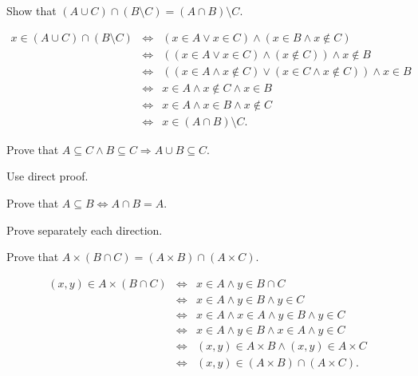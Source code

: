 \documentclass[11pt,paper=b5,footinclude,headinclude]{scrbook} %
\theoremstyle{remark}
\theoremstyle{definition} %
\theoremstyle{theorem} %
\newtheorem{ex}{Exercise\hypertarget{sol:\theex}}[chapter]
\begin{document}
\begin{ex}
\end{ex} \begin{ex}Show that $(A\cup C)\cap (B\setminus C) = (A\cap B)\setminus C$.
\begin{sol}
\begin{eqnarray*}
x\in (A\cup C)\cap (B\setminus C) &\Leftrightarrow & (x\in A \vee x\in C) \wedge (x\in B \wedge x\notin C)\\
 &\Leftrightarrow & ((x\in A \vee x\in C) \wedge (x\notin C))\wedge x\notin B\\
&\Leftrightarrow & ((x\in A \wedge x\notin C) \vee (x\in C \wedge x\notin C)) \wedge
 x\in B\\
&\Leftrightarrow & x\in A \wedge x\notin C  \wedge x\in B\\
&\Leftrightarrow & x\in A \wedge x\in B  \wedge x\notin C \\
&\Leftrightarrow & x \in (A\cap B)\setminus C. 
\end{eqnarray*}
\end{sol}

\end{ex}
\begin{ex}Prove that $A\subseteq C  \wedge B\subseteq C \Rightarrow A\cup B\subseteq C$.

\begin{sol}
    Use direct proof.
\end{sol}

\end{ex}
\begin{ex} Prove that $A\subseteq  B \Leftrightarrow A\cap B = A$.

\begin{sol}
    Prove separately each direction.
\end{sol}

\end{ex}
\begin{ex}
Prove that $A\times (B\cap C) = (A\times B)\cap (A\times C)$.


\begin{sol}
    
\begin{eqnarray*}
(x,y)\in A\times (B\cap C) &\Leftrightarrow & x \in A \wedge y\in B\cap C\\
&\Leftrightarrow & x \in A \wedge y\in B  \wedge y\in C\\
&\Leftrightarrow & x \in A \wedge x \in A\wedge y\in B  \wedge y\in C\\
&\Leftrightarrow & x \in A \wedge  y\in B  \wedge x \in A\wedge y\in C\\
&\Leftrightarrow & (x,y) \in A\times B \wedge  (x,y) \in A\times C\\
&\Leftrightarrow & (x,y) \in (A\times B)\cap   (A\times C).
\end{eqnarray*}
\end{sol}

\end{ex} 
\end{document}
